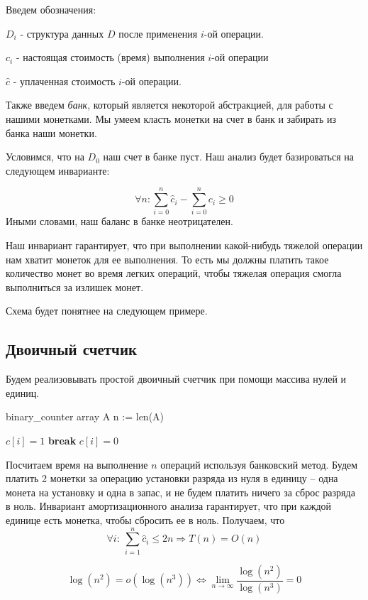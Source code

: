 \documentclass[../main.tex]{subfiles}
\begin{document}
	Введем обозначения:
	\begin{sign}
		$D_i$ - структура данных $D$ после применения $i$-ой операции.
	\end{sign}
	\begin{sign}
		$c_i$ - настоящая стоимость (время) выполнения $i$-ой операции
	\end{sign}
	\begin{sign}
		$\hat{c}$ - уплаченная стоимость $i$-ой операции. 
	\end{sign}
	
	Также введем \textit{банк}, который является некоторой абстракцией, для работы с нашими монетками. Мы умеем класть монетки на счет в банк и забирать из банка наши монетки. 
	
	Условимся, что на $D_0$ наш счет в банке пуст. Наш анализ будет базироваться на следующем инварианте: %
	
	\[
	\forall n : \sum_{i = 0}^n \hat{c}_i - \sum_{i = 0}^{n} c_i \geqslant 0	
	\]
	Иными словами, наш баланс в банке неотрицателен.
	
	Наш инвариант гарантирует, что при выполнении какой-нибудь тяжелой операции нам хватит монеток для ее выполнения. То есть мы должны платить такое количество монет во время легких операций, чтобы тяжелая операция смогла выполниться за излишек монет.
	
	
	Схема будет понятнее на следующем примере.
	
	
	\subsection{Двоичный счетчик}
	
	Будем реализовывать простой двоичный счетчик при помощи массива нулей и единиц.
	
	\begin{struct}{binary\_counter}
		\State array A
		\State n := len(A)
		
					\State $c[i] = 1$
					\State \textbf{break}
				\Else
					\State $c[i] = 0$
				\EndIf
			\EndFor
		\EndFunction
	\end{struct}
	
	Посчитаем время на выполнение $n$ операций используя банковский метод. Будем платить 2 монетки за операцию установки разряда из нуля в единицу -- одна монета на установку и одна в запас, и не будем платить ничего за сброс  разряда в ноль. Инвариант амортизационного анализа гарантирует, что при каждой единице есть монетка, чтобы сбросить ее в ноль. Получаем, что 
	\[
	\forall i: \ \sum_{i = 1}^{n} \hat{c}_i \leqslant 2n \Rightarrow T(n) = O(n)
	\]
	
	
	
	
	\[
	\log(n^2) = o(\log(n^3)) \Leftrightarrow \lim_{n \rightarrow \infty} \frac{\log(n^2)}{\log(n^3)} = 0
	\]
	
	
	
	
	
	
	
	
	
	
	
	
	
	
	
	\pagebreak
\end{document}
